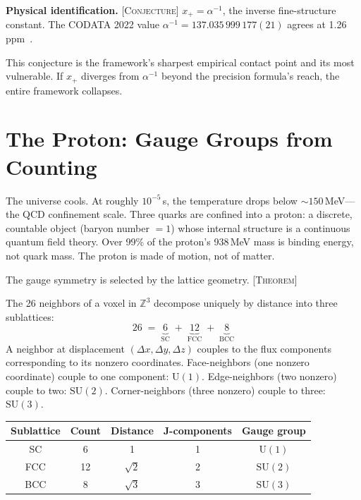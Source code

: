 \documentclass[12pt]{article}
\newcommand{\ZZ}{\mathbb{Z}}
\newcommand{\etag}[1]{{\normalfont\textsc{\footnotesize [#1]}}}
\theoremstyle{compact}
\begin{document}
\noindent\textbf{Physical identification.} \etag{Conjecture} $x_+ = \alpha^{-1}$, the inverse fine-structure constant. The CODATA 2022 value $\alpha^{-1} = 137.035\,999\,177(21)$ agrees at 1.26\,ppm~\cite{codata}.

This conjecture is the framework's sharpest empirical contact point and its most vulnerable. If $x_+$ diverges from $\alpha^{-1}$ beyond the precision formula's reach, the entire framework collapses.


\section{The Proton: Gauge Groups from Counting}
\label{sec:proton}

The universe cools. At roughly $10^{-5}$\,s, the temperature drops below $\sim 150$\,MeV---the QCD confinement scale. Three quarks are confined into a proton: a discrete, countable object (baryon number $= 1$) whose internal structure is a continuous quantum field theory. Over 99\% of the proton's 938\,MeV mass is binding energy, not quark mass. The proton is made of motion, not of matter.

The gauge symmetry is selected by the lattice geometry. \etag{Theorem}

The 26 neighbors of a voxel in $\ZZ^3$ decompose uniquely by distance into three sublattices:
\[
26 \;=\; \underbrace{6}_{\text{SC}} \;+\; \underbrace{12}_{\text{FCC}} \;+\; \underbrace{8}_{\text{BCC}}
\]
A neighbor at displacement $(\Delta x, \Delta y, \Delta z)$ couples to the flux components corresponding to its nonzero coordinates. Face-neighbors (one nonzero coordinate) couple to one component: $\mathrm{U}(1)$. Edge-neighbors (two nonzero) couple to two: $\mathrm{SU}(2)$. Corner-neighbors (three nonzero) couple to three: $\mathrm{SU}(3)$.

\begin{center}
\begin{tabular}{ccccc}
\toprule
Sublattice & Count & Distance & $\mathbf{J}$-components & Gauge group \\
\midrule
SC & 6 & 1 & 1 & $\mathrm{U}(1)$ \\
FCC & 12 & $\sqrt{2}$ & 2 & $\mathrm{SU}(2)$ \\
BCC & 8 & $\sqrt{3}$ & 3 & $\mathrm{SU}(3)$ \\
\bottomrule
\end{tabular}
\end{center}
\end{document}
